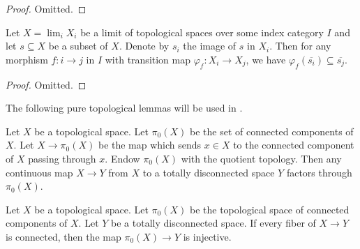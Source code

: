 \begin{proof}
  Omitted.
\end{proof}

\begin{lemma}
  \label{thm:closure-limit-compatible}
  Let $X = \lim_i X_i$ be a limit of topological spaces over some index category \(I\) and let
  $s \subseteq X$ be a subset of \(X\). Denote by $s_i$ the image of $s$ in $X_i$. Then for any morphism \(f : i \to j\) in \(I\) with transition map \(\varphi_{f} : X_i \to X_j\), we have \(\varphi_{f}(\overline{s_i}) \subseteq \overline{s_j}\).
  \leanok
\end{lemma}

\begin{proof}
  Omitted.
\end{proof}

The following pure topological lemmas will be used in .

\begin{definition}
  \label{def:pi0-to-totally-disconnected}
  \leanok
  Let \(X\) be a topological space. Let \(\pi_0(X)\) be the set of connected components of \(X\). Let \(X \to \pi_0(X)\) be the map which sends \(x \in X\) to the connected component of \(X\) passing through \(x\). Endow \(\pi_0(X)\) with the quotient topology. Then %
  any continuous map \(X \to Y\) from \(X\) to a totally disconnected space \(Y\) factors through \(\pi_0(X)\).
\end{definition}


\begin{lemma}
  \label{thm:pi0-to-totally-disconnected-injective}
  \leanok
  Let \(X\) be a topological space. Let \(\pi_0(X)\) be the topological space of connected components of \(X\). Let \(Y\) be a totally disconnected space. If every fiber of \(X \to Y\) is connected, then the map \(\pi_0(X) \to Y\) is injective.
\end{lemma}

